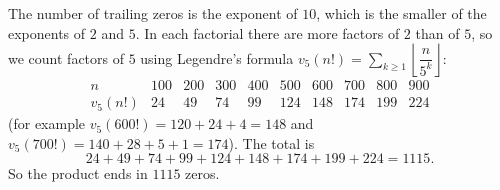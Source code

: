 The number of trailing zeros is the exponent of \(10\), which is the smaller of the exponents of \(2\) and \(5\). In each factorial there are more factors of \(2\) than of \(5\), so we count factors of \(5\) using Legendre's formula \(v_5(n!)=\sum_{k\ge1}\left\lfloor\dfrac{n}{5^k}\right\rfloor\):
\[
\begin{array}{c|ccccccccc}
n&100&200&300&400&500&600&700&800&900\\ \hline
v_5(n!)&24&49&74&99&124&148&174&199&224
\end{array}
\]
(for example \(v_5(600!)=120+24+4=148\) and \(v_5(700!)=140+28+5+1=174\)). The total is
\[
24+49+74+99+124+148+174+199+224=1115 .
\]
So the product ends in \(\boxed{1115}\) zeros.
